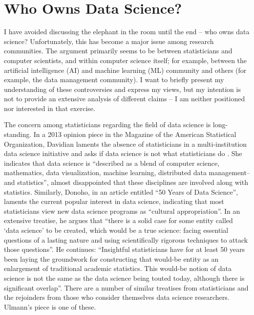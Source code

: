 \documentclass[11pt]{article}
\begin{document}
\section{Who Owns Data Science?}

I have avoided discussing the elephant in the room until the end -- who owns data science? Unfortunately, this has become a major issue among research communities. The argument primarily seems to be between statisticians and computer scientists, and within computer science itself; for example, between the artificial intelligence (AI) and machine learning (ML) community and others (for example, the data management community). I want to briefly present my understanding of these controversies and express my views, but my intention is not to provide an extensive analysis of different claims -- I am neither positioned nor interested in that exercise.

The concern among statisticians regarding the field of data science is long-standing. In a 2013 opinion piece in the Magazine of the American Statistical Organization, Davidian laments the absence of statisticians in a multi-institution data science initiative and asks if data science is not what statisticians do \cite{Davidian2013}. She indicates that data science is ``described as a blend of computer science, mathematics, data visualization, machine learning, distributed data management--and statistics'', almost disappointed that these disciplines are involved along with statistics. Similarly,  Donoho, in an article entitled ``50 Years of Data Science'', laments the current popular interest in data science, indicating that most statisticians view new data science programs as ``cultural appropriation''. In an extensive treatise, he argues that ``there is a solid case for some entity called `data science' to be created, which would be a true science: facing essential questions of a lasting nature and using scientifically rigorous techniques to attack those questions''. He continues: ``Insightful statisticians have for at least 50 years been laying the groundwork for constructing that would-be entity as an enlargement of traditional academic statistics. This would-be notion of data science is not the same as the data science being touted today, although there is significant overlap''\cite{Donoho2017}. There are a number of similar treatises from statisticians and the rejoinders from those who consider themselves data science researchers. Ulmann's piece \cite{Ullman:2020aa} is one of these.
\end{document}
